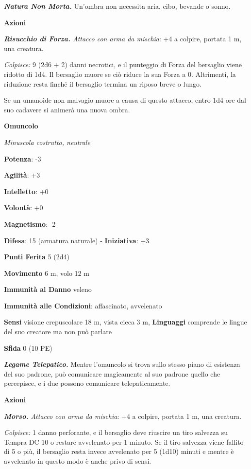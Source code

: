 \begin{multicols}{2}
\emph{\textbf{Natura Non Morta.}} Un'ombra non necessita aria, cibo,
bevande o sonno.

\smallskip\textbf{Azioni}

\emph{\textbf{Risucchio di Forza.} Attacco con arma da mischia}: +4 a
colpire, portata 1 m, una creatura.

\emph{Colpisce:} 9 (2d6 + 2) danni necrotici, e il punteggio di Forza
del bersaglio viene ridotto di 1d4. Il bersaglio muore se ciò riduce la
sua Forza a 0. Altrimenti, la riduzione resta finché il bersaglio
termina un riposo breve o lungo.

Se un umanoide non malvagio muore a causa di questo attacco, entro 1d4
ore dal suo cadavere si animerà una nuova ombra.

\textbf{Omuncolo}

\emph{Minuscola costrutto, neutrale}

\textbf{Potenza}: -3

\textbf{Agilità}: +3

\textbf{Intelletto}: +0

\textbf{Volontà}: +0

\textbf{Magnetismo}: -2

\textbf{Difesa}: 15 (armatura naturale) - \textbf{Iniziativa}: +3

\textbf{Punti Ferita} 5 (2d4)

\textbf{Movimento} 6 m, volo 12 m

\textbf{Immunità al Danno} veleno

\textbf{Immunità alle Condizioni}: affascinato, avvelenato

\textbf{Sensi} visione crepuscolare 18 m, vista cieca 3 m, 
\textbf{Linguaggi} comprende le lingue del suo creatore ma non può
parlare

\textbf{Sfida} 0 (10 PE)\smallskip

\emph{\textbf{Legame Telepatico.}} Mentre l'omuncolo si trova sullo
stesso piano di esistenza del suo padrone, può comunicare magicamente al
suo padrone quello che percepisce, e i due possono comunicare
telepaticamente.

\smallskip\textbf{Azioni}

\emph{\textbf{Morso.} Attacco con arma da mischia}: +4 a colpire,
portata 1 m, una creatura.

\emph{Colpisce:} 1 danno perforante, e il bersaglio deve riuscire un
tiro salvezza su Tempra DC 10 o restare avvelenato per 1 minuto.
Se il tiro salvezza viene fallito di 5 o più, il bersaglio resta invece
avvelenato per 5 (1d10) minuti e mentre è avvelenato in questo modo è
anche privo di sensi.




\end{multicols}

